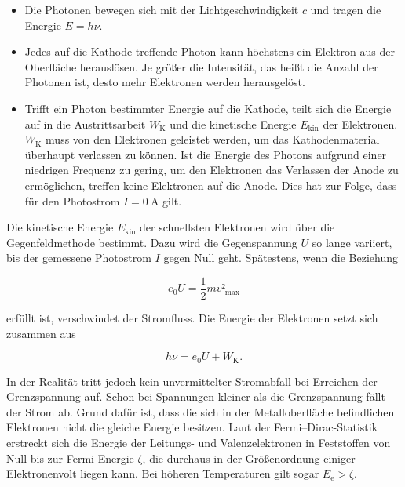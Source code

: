 \begin{itemize}
	\item Die Photonen bewegen sich mit der Lichtgeschwindigkeit $c$ und tragen die Energie  $E=h\nu$.
	\item Jedes auf die Kathode treffende Photon kann höchstens ein Elektron aus der Oberfläche herauslösen. Je größer die Intensität, das heißt die Anzahl der Photonen ist, desto mehr Elektronen werden herausgelöst.
	\item Trifft ein Photon bestimmter Energie auf die Kathode, teilt sich die Energie auf in die Austrittsarbeit $W_\mathup{K}$ und die kinetische Energie $E_\mathup{kin}$ der Elektronen. $W_\mathup{K}$ muss von den Elektronen geleistet werden, um das Kathodenmaterial überhaupt verlassen zu können. Ist die Energie des Photons aufgrund einer niedrigen Frequenz zu gering, um den Elektronen das Verlassen der Anode zu ermöglichen, treffen keine Elektronen auf die Anode. Dies hat zur Folge, dass für den Photostrom $I=\SI{0}{\ampere}$ gilt.
\end{itemize}

Die kinetische Energie $E_\mathup{kin}$ der schnellsten Elektronen wird über die Gegenfeldmethode bestimmt. 
Dazu wird die Gegenspannung $U$ so lange variiert, bis der gemessene Photostrom $I$ gegen Null geht. 
Spätestens, wenn die Beziehung

\begin{equation}
	e_0 U=\frac{1}{2}mv²_\mathup{max}
\end{equation}

erfüllt ist, verschwindet der Stromfluss.
Die Energie der Elektronen setzt sich zusammen aus

\begin{equation}
	h\nu=e_0 U+W_\mathup{K}.
	\label{eq:einstein}
\end{equation}

In der Realität tritt jedoch kein unvermittelter Stromabfall bei Erreichen der Grenzspannung auf. 
Schon bei Spannungen kleiner als die Grenzspannung fällt der Strom ab.
Grund dafür ist, dass die sich in der Metalloberfläche befindlichen Elektronen nicht die gleiche Energie besitzen. 
Laut der Fermi--Dirac-Statistik erstreckt sich die Energie der Leitungs- und Valenzelektronen in Feststoffen von Null bis zur Fermi-Energie $\zeta$, die durchaus in der Größenordnung einiger Elektronenvolt liegen kann.
Bei höheren Temperaturen gilt sogar $E_\mathup{e}>\zeta$. 

